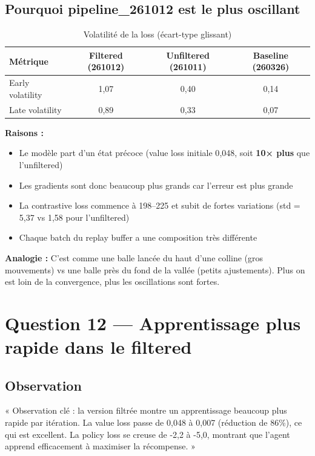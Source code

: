 \documentclass[11pt,a4paper]{article}
\begin{document}
\subsection{Pourquoi pipeline\_261012 est le plus oscillant}

\begin{table}[h]
\centering
\begin{tabular}{lccc}
\toprule
\textbf{Métrique} & \textbf{Filtered (261012)} & \textbf{Unfiltered (261011)} & \textbf{Baseline (260326)} \\
\midrule
Early volatility & 1{,}07 & 0{,}40 & 0{,}14 \\
Late volatility & 0{,}89 & 0{,}33 & 0{,}07 \\
\bottomrule
\end{tabular}
\caption{Volatilité de la loss (écart-type glissant)}
\end{table}

\textbf{Raisons :}
\begin{itemize}
    \item Le modèle part d'un état précoce (value loss initiale 0{,}048, soit \textbf{10× plus} que l'unfiltered)
    \item Les gradients sont donc beaucoup plus grands car l'erreur est plus grande
    \item La contrastive loss commence à 198--225 et subit de fortes variations (std = 5{,}37 vs 1{,}58 pour l'unfiltered)
    \item Chaque batch du replay buffer a une composition très différente
\end{itemize}

\textbf{Analogie :} C'est comme une balle lancée du haut d'une colline (gros mouvements) vs une balle près du fond de la vallée (petits ajustements). Plus on est loin de la convergence, plus les oscillations sont fortes.

\section{Question 12 — Apprentissage plus rapide dans le filtered}

\subsection{Observation}

« Observation clé : la version filtrée montre un apprentissage beaucoup plus rapide par itération. La value loss passe de 0{,}048 à 0{,}007 (réduction de 86\%), ce qui est excellent. La policy loss se creuse de -2{,}2 à -5{,}0, montrant que l'agent apprend efficacement à maximiser la récompense. »
\end{document}
